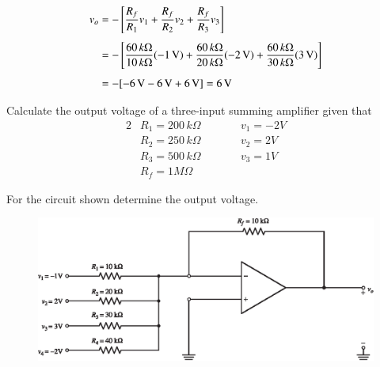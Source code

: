\begin{solution}
\begin{align*}
v_{o} &= -\left[\frac{R_{f}}{R_{1}}v_{1}+\frac{R_{f}}{R_{2}}v_{2}+\frac{R_{f}}{R_{3}}v_{3}\right]\\[4pt]
&= -\left[\frac{60\, k\Omega}{10\, k\Omega}(-1\text{\,V})+\frac{60\, k\Omega}{20\, k\Omega}(-2\text{\,V})+\frac{60\, k\Omega}{30\, k\Omega}(3\text{\,V})\right]\\[4pt]
&= - [-6\text{\,V}-6\text{\,V}+6\text{\,V}]=6\text{\,V}
\end{align*}
\vskip -1cm
\end{solution}

\eject

\begin{example}\label{exam5.19}
Calculate the output voltage of a three-input summing amplifier given that
\begin{alignat*}{2}
& R_{1}=200\, k\Omega &\qquad& v_{1}=-2V\\
& R_{2}=250\, k\Omega &\qquad& v_{2}=2V\\
& R_{3}=500\, k\Omega &\qquad& v_{3}=1V\\
& R_{f}=1 M\Omega &&
\end{alignat*}
\end{example}


\begin{example}\label{exam5.20}
For the circuit shown determine the output voltage.
\begin{figure}[H]
\centering
\includegraphics{chap4/S3-EE-06-IN012.eps}
\end{figure}
\end{example}

